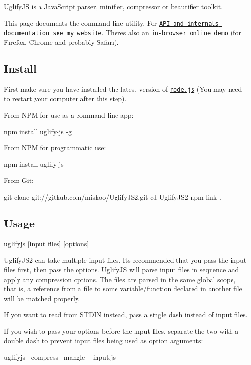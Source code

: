 \href{https://travis-ci.org/mishoo/UglifyJS2}{\tt }

Uglify\+JS is a Java\+Script parser, minifier, compressor or beautifier toolkit.

This page documents the command line utility. For \href{http://lisperator.net/uglifyjs/}{\tt A\+PI and internals documentation see my website}. There\textquotesingle{}s also an \href{http://lisperator.net/uglifyjs/#demo}{\tt in-\/browser online demo} (for Firefox, Chrome and probably Safari).

\subsection*{Install }

First make sure you have installed the latest version of \href{http://nodejs.org/}{\tt node.\+js} (You may need to restart your computer after this step).

From N\+PM for use as a command line app\+: \begin{DoxyVerb}npm install uglify-js -g
\end{DoxyVerb}


From N\+PM for programmatic use\+: \begin{DoxyVerb}npm install uglify-js
\end{DoxyVerb}


From Git\+: \begin{DoxyVerb}git clone git://github.com/mishoo/UglifyJS2.git
cd UglifyJS2
npm link .
\end{DoxyVerb}


\subsection*{Usage }

\begin{DoxyVerb}uglifyjs [input files] [options]
\end{DoxyVerb}


Uglify\+J\+S2 can take multiple input files. It\textquotesingle{}s recommended that you pass the input files first, then pass the options. Uglify\+JS will parse input files in sequence and apply any compression options. The files are parsed in the same global scope, that is, a reference from a file to some variable/function declared in another file will be matched properly.

If you want to read from S\+T\+D\+IN instead, pass a single dash instead of input files.

If you wish to pass your options before the input files, separate the two with a double dash to prevent input files being used as option arguments\+: \begin{DoxyVerb}uglifyjs --compress --mangle -- input.js
\end{DoxyVerb}


